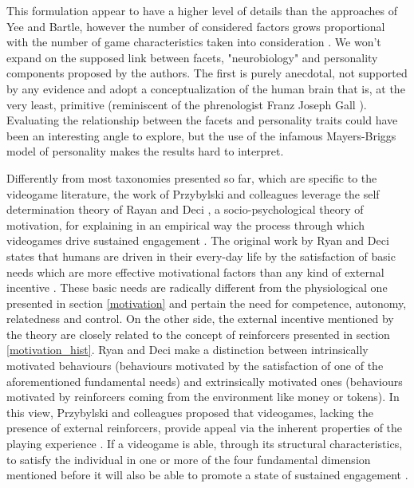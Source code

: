 

This formulation appear to have a higher level of details than the approaches of Yee and Bartle, however the number of considered factors grows proportional with the number of game characteristics taken into consideration \cite{nacke2011brainhex}. We won't expand on the supposed link between facets, "neurobiology" and personality components proposed by the authors. The first is purely anecdotal, not supported by any evidence and adopt a conceptualization of the human brain that is, at the very least, primitive (reminiscent of the phrenologist Franz Joseph Gall \cite{gall1835functions})\cite{nacke2011brainhex}. Evaluating the relationship between the facets and personality traits could have been an interesting angle to explore, but the use of the infamous Mayers-Briggs model of personality \cite{boyle1995myers} makes the results hard to interpret. 

Differently from most taxonomies presented so far, which are specific to the videogame literature, the work of Przybylski and colleagues leverage the self determination theory of Rayan and Deci \cite{ryan2000self,ryan2006motivational}, a socio-psychological theory of  motivation, for explaining in an empirical way the process through which videogames drive sustained engagement \cite{przybylski2010motivational}. The original work by Ryan and Deci states that humans are driven in their every-day life by the satisfaction of basic needs which are more effective motivational factors than any kind of  external incentive \cite{ryan2000self,ryan2006motivational}. These basic needs are radically different from the physiological one presented in section \ref{motivation} and pertain the need for competence, autonomy, relatedness and control. On the other side, the external incentive mentioned by the theory are closely related to the concept of reinforcers presented in section \ref{motivation_hist}. Ryan and Deci make a distinction between intrinsically motivated behaviours (behaviours motivated by the satisfaction of one of the aforementioned fundamental needs) and extrinsically motivated ones (behaviours motivated by reinforcers coming from the environment like money or tokens). In this view, Przybylski and colleagues proposed that videogames, lacking the presence of external reinforcers, provide appeal via the inherent properties of the playing experience \cite{przybylski2010motivational}. If a videogame is able, through its structural characteristics, to satisfy the individual in one or more of the four fundamental dimension mentioned before it will also be able to promote a state of sustained engagement \cite{przybylski2010motivational}.

